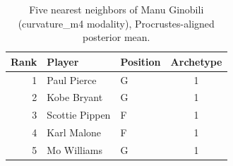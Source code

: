 \begin{table}[htbp]
  \centering\small
  \begin{tabular}{rllc}
    \toprule
    Rank & Player & Position & Archetype \\
    \midrule
    1 & Paul Pierce & G & 1 \\
    2 & Kobe Bryant & G & 1 \\
    3 & Scottie Pippen & F & 1 \\
    4 & Karl Malone & F & 1 \\
    5 & Mo Williams & G & 1 \\
    \bottomrule
  \end{tabular}
  \caption{Five nearest neighbors of Manu Ginobili (curvature_m4 modality), Procrustes-aligned posterior mean.}
  \label{tab:Manu_Ginobili_neighbors_curvature_m4}
\end{table}

